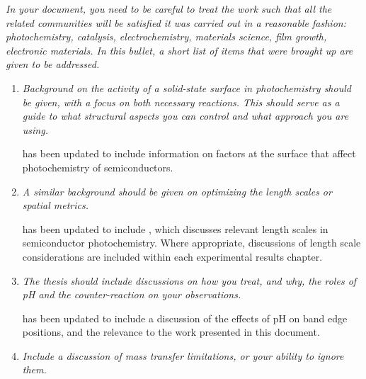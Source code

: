 \documentclass[12pt,%
               letterpaper,
               oneside]{uiothesis}
\begin{document}
\begin{enum}
  \item \emph{In your document, you need to be careful to treat the work such that all the related communities will be satisfied it was carried out in a reasonable fashion: photochemistry, catalysis, electrochemistry, materials science, film growth, electronic materials. In this bullet, a short list of items that were brought up are given to be addressed.} \vspace{8pt}
  
  \begin{enumerate}[label=\alph*,leftmargin=1em]
  \item \emph{Background on the activity of a solid-state surface in photochemistry should be given, with a focus on both necessary reactions. This should serve as a guide to what structural aspects you can control and what approach you are using.}\vspace{16pt}
  
     has been updated to include information on factors at the surface that affect photochemistry of semiconductors.\vspace{16pt}
  
  \item \emph{A similar background should be given on optimizing the length scales or spatial metrics.}\vspace{8pt}
  
   has been updated to include , which discusses relevant length scales in semiconductor photochemistry. Where appropriate, discussions of length scale considerations are included within each experimental results chapter.\vspace{16pt}
  
  \item \emph{The thesis should include discussions on how you treat, and why, the roles of pH and the counter-reaction on your observations.}\vspace{8pt}
  
   has been updated to include a discussion of the effects of pH on band edge positions, and the relevance to the work presented in this document.
  
  \vspace{16pt}
  
  \item \emph{Include a discussion of mass transfer limitations, or your ability to ignore them.}\vspace{8pt}
  

\end{enumerate}
\end{enum}
\end{document}
